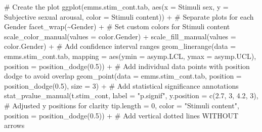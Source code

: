 \documentclass[
  bookmarksnumbered]{article}
\newenvironment{Shaded}{\begin{snugshade}}{\end{snugshade}}
\newcommand{\AttributeTok}[1]{\textcolor[rgb]{0.80,0.80,0.80}{#1}}
\newcommand{\CommentTok}[1]{\textcolor[rgb]{0.50,0.62,0.50}{#1}}
\newcommand{\DecValTok}[1]{\textcolor[rgb]{0.86,0.86,0.80}{#1}}
\newcommand{\FloatTok}[1]{\textcolor[rgb]{0.75,0.75,0.82}{#1}}
\newcommand{\FunctionTok}[1]{\textcolor[rgb]{0.94,0.94,0.56}{#1}}
\newcommand{\NormalTok}[1]{\textcolor[rgb]{0.80,0.80,0.80}{#1}}
\newcommand{\SpecialCharTok}[1]{\textcolor[rgb]{0.86,0.64,0.64}{#1}}
\newcommand{\StringTok}[1]{\textcolor[rgb]{0.80,0.58,0.58}{#1}}
\begin{document}
\begin{Shaded}
\begin{Highlighting}[]
\CommentTok{\# Create the plot}
\FunctionTok{ggplot}\NormalTok{(emms.stim\_cont.tab, }\FunctionTok{aes}\NormalTok{(}\AttributeTok{x =} \StringTok{\textasciigrave{}}\AttributeTok{Stimuli sex}\StringTok{\textasciigrave{}}\NormalTok{, }\AttributeTok{y =} \StringTok{\textasciigrave{}}\AttributeTok{Subjective sexual arousal}\StringTok{\textasciigrave{}}\NormalTok{, }
                               \AttributeTok{color =} \StringTok{\textasciigrave{}}\AttributeTok{Stimuli content}\StringTok{\textasciigrave{}}\NormalTok{)) }\SpecialCharTok{+}
  \CommentTok{\# Separate plots for each Gender}
  \FunctionTok{facet\_wrap}\NormalTok{(}\SpecialCharTok{\textasciitilde{}}\NormalTok{Gender) }\SpecialCharTok{+}
  \CommentTok{\# Set custom colors for Stimuli content}
  \FunctionTok{scale\_color\_manual}\NormalTok{(}\AttributeTok{values =}\NormalTok{ color.Gender) }\SpecialCharTok{+}
  \FunctionTok{scale\_fill\_manual}\NormalTok{(}\AttributeTok{values =}\NormalTok{ color.Gender) }\SpecialCharTok{+}
  \CommentTok{\# Add confidence interval ranges}
  \FunctionTok{geom\_linerange}\NormalTok{(}\AttributeTok{data =}\NormalTok{ emms.stim\_cont.tab,}
                 \AttributeTok{mapping =} \FunctionTok{aes}\NormalTok{(}\AttributeTok{ymin =}\NormalTok{ asymp.LCL, }\AttributeTok{ymax =}\NormalTok{ asymp.UCL),}
                 \AttributeTok{position =} \FunctionTok{position\_dodge}\NormalTok{(}\FloatTok{0.5}\NormalTok{)) }\SpecialCharTok{+} 
  \CommentTok{\# Add individual data points with position dodge to avoid overlap}
  \FunctionTok{geom\_point}\NormalTok{(}\AttributeTok{data =}\NormalTok{ emms.stim\_cont.tab, }
             \AttributeTok{position =} \FunctionTok{position\_dodge}\NormalTok{(}\FloatTok{0.5}\NormalTok{), }
             \AttributeTok{size =} \DecValTok{3}\NormalTok{) }\SpecialCharTok{+}
  \CommentTok{\# Add statistical significance annotations}
  \FunctionTok{stat\_pvalue\_manual}\NormalTok{(t.stim\_cont, }
                     \AttributeTok{label =} \StringTok{"p.signif"}\NormalTok{, }
                     \AttributeTok{y.position =} \FunctionTok{c}\NormalTok{(}\FloatTok{2.7}\NormalTok{, }\DecValTok{3}\NormalTok{, }\FloatTok{4.2}\NormalTok{, }\DecValTok{3}\NormalTok{),  }\CommentTok{\# Adjusted y positions for clarity}
                     \AttributeTok{tip.length =} \DecValTok{0}\NormalTok{,}
                     \AttributeTok{color =} \StringTok{"Stimuli content"}\NormalTok{,}
                     \AttributeTok{position =} \FunctionTok{position\_dodge}\NormalTok{(}\FloatTok{0.5}\NormalTok{)) }\SpecialCharTok{+}
  \CommentTok{\# Add vertical dotted lines WITHOUT arrows}

\end{Highlighting}
\end{Shaded}
\end{document}
